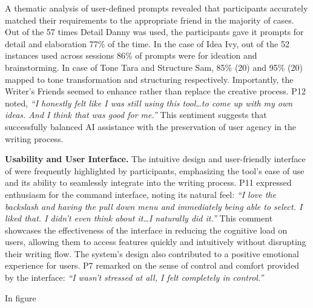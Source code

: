 A thematic analysis of user-defined prompts revealed that participants accurately matched their requirements to the appropriate friend in the majority of cases. Out of the 57 times Detail Danny was used, the participants gave it prompts for detail and elaboration 77\% of the time. In the case of Idea Ivy, out of the 52 instances used across sessions 86\% of prompts were for ideation and brainstorming. In case of Tone Tara and  Structure Sam, 85\% (20) and 95\% (20) mapped to tone transformation and structuring respectively. Importantly, the Writer's Friends seemed to enhance rather than replace the creative process. P12 noted, \textit{``I honestly felt like I was still using this tool\ldots to come up with my own ideas. And I think that was good for me.''} This sentiment suggests that \system successfully balanced AI assistance with the preservation of user agency in the writing process. 

\textbf{Usability and User Interface.} The intuitive design and user-friendly interface of \system were frequently highlighted by participants, emphasizing the tool's ease of use and its ability to seamlessly integrate into the writing process. P11 expressed enthusiasm for the command interface, noting its natural feel: \textit{``I love the backslash and having the pull down menu and immediately being able to select. I liked that. I didn't even think about it\ldots I naturally did it.''} This comment showcases the effectiveness of the interface in reducing the cognitive load on users, allowing them to access features quickly and intuitively without disrupting their writing flow. The system's design also contributed to a positive emotional experience for users. P7 remarked on the sense of control and comfort provided by the interface: \textit{``I wasn't stressed at all, I felt completely in control.''}

In figure 



